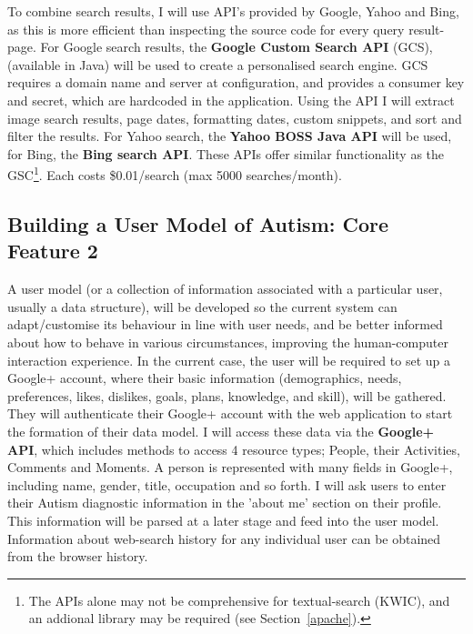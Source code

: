 \documentclass[a4paper, 10pt]{article}
\begin{document}
To combine search results, I will use API’s provided by Google, Yahoo and Bing, as this is more efficient than inspecting the source code for every query result-page. For Google search results, the \textbf{Google Custom Search API} (GCS), (available in Java) will be used to create a personalised search engine. GCS requires a domain name and server at configuration, and provides a consumer key and secret, which are hardcoded in the application. Using the API I will extract image search results, page dates, formatting dates, custom snippets, and sort and filter the results. For Yahoo search, the \textbf{Yahoo BOSS Java API} will be used, for Bing, the \textbf{Bing search API}. These APIs offer similar functionality as the GSC\footnote{The APIs alone may not be comprehensive for textual-search (KWIC), and an addional library may be required (see Section~\ref{apache}).}. Each costs \$0.01/search (max 5000 searches/month).

\subsection {Building a User Model of Autism: Core Feature 2}\label{usermodel}
A user model (or a collection of information associated with a particular user, usually a data structure), will be developed so the current system can adapt/customise its behaviour in line with user needs, and be better informed about how to behave in various circumstances, improving the human-computer interaction experience. In the current case, the user will be required to set up a Google+ account, where their basic information (demographics, needs, preferences, likes, dislikes, goals, plans, knowledge, and skill), will be gathered. They will authenticate their Google+ account with the web application to start the formation of their data model. I will access these data via the \textbf{Google+ API}, which includes methods to access 4 resource  types; People, their Activities, Comments and Moments. A person is represented with many fields in Google+, including name, gender, title, occupation and so forth. I will ask users to enter their Autism diagnostic information in the 'about me' section on their profile. This information will be parsed at a later stage and feed into the user model. Information about web-search history for any individual user can be obtained from the browser history. 
\end{document}
